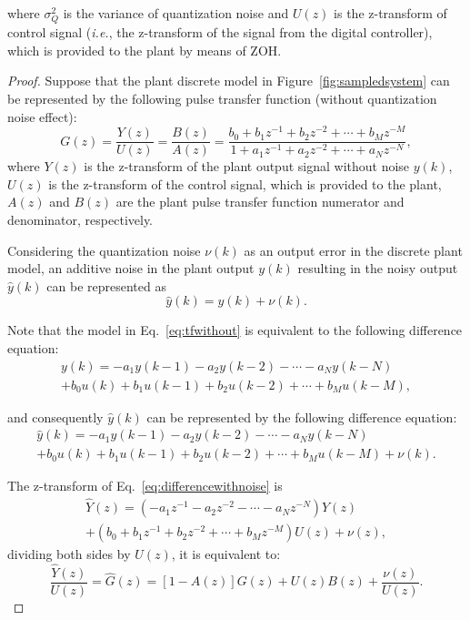 \documentclass{sig-alternate-05-2015}
\begin{document}
\noindent where $\sigma_{Q}^{2}$ is the variance of quantization noise and
$U(z)$ is the z-transform of control signal ({\it i.e.}, the z-transform of
the signal from the digital controller), which is provided to the plant by
means of ZOH.
%
\begin{proof}
%
Suppose that the plant discrete model in Figure~\ref{fig:sampledsystem} can
be represented by the following pulse transfer function (without
quantization noise effect):
%
\begin{equation}
\label{eq:tfwithout}
G(z)=\frac{Y(z)}{U(z)}=\frac{B(z)}{A(z)}=\frac{b_{0}+b_{1}z^{-1}+b_{2}z^{-2}+\cdots+b_{M}z^{-M}}{1+a_{1}z^{-1}+a_{2}z^{-2}+\cdots+a_{N}z^{-N}},
\end{equation}
%
\noindent where $Y(z)$ is the z-transform of the plant output signal without
noise $y(k)$, $U(z)$ is the z-transform of the control signal, which is
provided to the plant, $A(z)$ and $B(z)$ are the plant pulse transfer
function numerator and denominator, respectively.

Considering the quantization noise $\nu(k)$ as an output error in the
discrete plant model, an additive noise in the plant output $y(k)$ resulting
in the noisy output $\hat{y}(k)$ can be represented as
%
\begin{equation}
\hat{y}(k)=y(k)+\nu(k).
\end{equation}

Note that the model in Eq.~\eqref{eq:tfwithout} is equivalent to the
following difference equation:
%
\begin{equation}
\begin{split}
y(k)=-a_{1}y(k-1)-a_{2}y(k-2)-\cdots - a_{N}y(k-N)\\
+b_{0}u(k)+b_{1}u(k-1)+b_{2}u(k-2)+\cdots+b_{M}u(k-M),
\end{split}
\end{equation}

\noindent and consequently $\hat{y}(k)$ can be represented by the following
difference equation:
%
\begin{equation}
\label{eq:differencewithnoise}
\begin{split}
\hat{y}(k)=-a_{1}y(k-1)-a_{2}y(k-2)-\cdots - a_{N}y(k-N)\\
+b_{0}u(k)+b_{1}u(k-1)+b_{2}u(k-2)+\cdots+b_{M}u(k-M)+\nu(k).
\end{split}
\end{equation}

The z-transform of Eq.~\eqref{eq:differencewithnoise} is
%
\begin{equation}
\begin{split}
\hat{Y}(z)=(-a_{1}z^{-1}-a_{2}z^{-2}-\cdots-a_{N}z^{-N})Y(z)\\
+(b_{0}+b_{1}z^{-1}+b_{2}z^{-2}+\cdots+b_{M}z^{-M})U(z)+\nu(z),
\end{split}
\end{equation}
dividing both sides by $U(z)$, it is equivalent to:
\begin{equation}
\frac{\hat{Y}(z)}{U(z)}=\hat{G}(z)=[1-A(z)]G(z)+U(z)B(z)+\frac{\nu(z)}{U(z)}.
\end{equation}


\end{proof}
\end{document}
